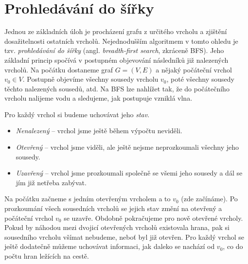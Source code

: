 \section{Prohledávání do šířky}\label{sec:bfs}

Jednou ze základních úloh je procházení grafu z určitého vrcholu a zjištění dosažitelnosti ostatních vrcholů. Nejednodušším algoritmem v tomto ohledu je tzv. \emph{prohledávání do šířky} (angl. \emph{breadth-first search}, zkráceně BFS). Jeho základní princip spočívá v postupném objevování následníků již nalezených vrcholů. Na počátku dostaneme graf $G=(V,E)$ a nějaký počáteční vrchol $v_0\in V$. Postupně objevíme všechny sousedy vrcholu $v_0$, poté všechny sousedy těchto nalezených sousedů, atd. Na BFS lze nahlížet tak, že do počátečního vrcholu nalijeme vodu a sledujeme, jak postupuje vzniklá vlna.

Pro každý vrchol si budeme uchovávat jeho \emph{stav}.
\begin{itemize}
    \item \emph{Nenalezený} -- vrchol jsme ještě během výpočtu neviděli.
    \item \emph{Otevřený} -- vrchol jsme viděli, ale ještě nejsme neprozkoumali všechny jeho sousedy.
    \item \emph{Uzavřený} -- vrchol jsme prozkoumali společně se všemi jeho sousedy a dál se jím již netřeba zabývat.
\end{itemize}
Na počátku začneme s jedním otevřeným vrcholem a to $v_0$ (zde začínáme). Po prozkoumání všech sousedních vrcholů se jejich stav změní na otevřený a počáteční vrchol $v_0$ se uzavře. Obdobně pokračujeme pro nově otevřené vrcholy. Pokud by náhodou mezi dvojicí otevřených vrcholů existovala hrana, pak si sousedního vrcholu všímat nebudeme, neboť byl již otevřen. Pro každý vrchol se ještě dodatečně můžeme uchovávat informaci, jak daleko se nachází od $v_0$, co do počtu hran ležících na cestě.

